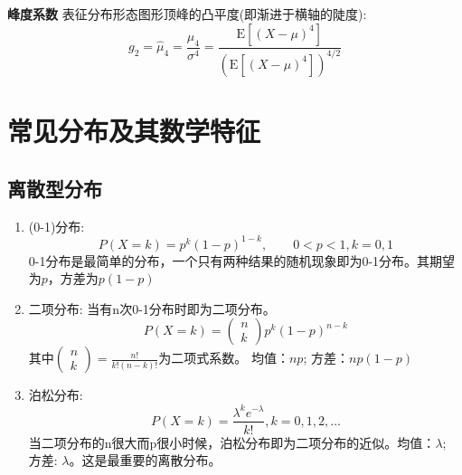 \begin{definition}{\textbf{峰度系数}}
    表征分布形态图形顶峰的凸平度(即渐进于横轴的陡度):
    \begin{equation}
        g_2 = \hat{\mu}_4 = \frac{\mu_4}{\sigma^4}=\frac{\mathrm{E}[(X-\mu)^4]}{(\mathrm{E}[(X-\mu)^4])^{4/2}}
    \end{equation}
\end{definition}


\section{常见分布及其数学特征}
\subsection{离散型分布}

\begin{enumerate}
\item (0-1)分布:
\begin{equation}
    P(X=k)=p^{k}(1-p)^{1-k},\qquad 0<p<1, k=0,1
\end{equation}
0-1分布是最简单的分布，一个只有两种结果的随机现象即为0-1分布。其期望为$p$，方差为$p(1-p)$

\item 二项分布: 当有n次0-1分布时即为二项分布。
\begin{equation}
    P(X=k)=\left(\begin{array}{l}n \\k\end{array}\right) p^{k}(1-p)^{n-k}
\end{equation}
其中$\left(\begin{matrix} n\\k \end{matrix}\right)=\frac{n!}{k!(n-k)!}$为二项式系数。
均值：$np$; 方差：$np(1-p)$

\item 泊松分布: 
\begin{equation}
    P(X=k)=\frac{\lambda^{k} e^{-\lambda}}{k !}, k=0,1,2, \ldots
\end{equation}
当二项分布的n很大而p很小时候，泊松分布即为二项分布的近似。均值：$\lambda$; 方差: $\lambda$。这是最重要的离散分布。
\end{enumerate}
